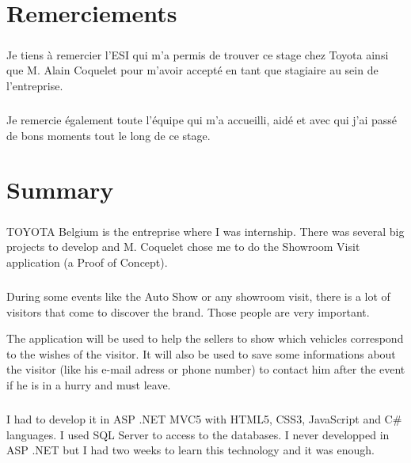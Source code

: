 \documentclass[12pt]{report}
\begin{document}

\chapter*{Remerciements}

\paragraph{}
Je tiens à remercier l’ESI qui m’a permis de trouver ce stage chez Toyota ainsi que M. Alain Coquelet pour m’avoir accepté en tant que stagiaire au sein de l’entreprise.
\paragraph{}
Je remercie également toute l’équipe qui m’a accueilli, aidé et avec qui j'ai passé de bons moments tout le long de ce stage. 

\tableofcontents

\chapter{Summary}

\paragraph{}
TOYOTA Belgium is the entreprise where I was internship.
There was several big projects to develop and M. Coquelet chose me to do the Showroom Visit application (a Proof of Concept). 

\paragraph{}
During some events like the Auto Show or any showroom visit, there is a lot of visitors that come to discover the brand. Those people are very important.

The application will be used to help the sellers to show which vehicles correspond to the wishes of the visitor. 
It will also be used to save some informations about the visitor (like his e-mail adress or phone number) to contact him after the event if he is in a hurry and must leave. 

\paragraph{}
I had to develop it in ASP .NET MVC5 with HTML5, CSS3, JavaScript and C\# languages. I used SQL Server to access to the databases. I never developped in ASP .NET but I had two weeks to learn this technology and it was enough. 
\end{document}
